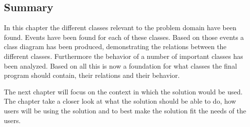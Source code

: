 \subsection{Summary}

In this chapter the different classes relevant to the problem domain have been found. Events have been found for each of these classes. 
Based on those events a class diagram has been produced, demonstrating the relations between the different classes. Furthermore the behavior of a number of important classes has been analyzed. Based on all this is now a foundation for what classes the final program should contain, their relations and their behavior.

The next chapter will focus on the context in which the solution would be used. The chapter take a closer look at what the solution should be able to do, how users will be using the solution and to best make the solution fit the needs of the users.














